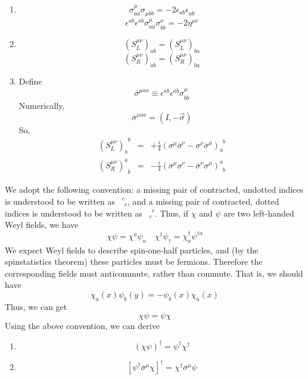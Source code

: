 \begin{newprop}
\begin{enumerate}
\item 
\[\sigma^{\mu}_{a\dot{a}} \sigma_{\mu b\dot{b}} = -2\epsilon_{ab} \epsilon_{\dot{a}\dot{b}}\]
\[\epsilon^{ab}\epsilon^{\dot{a}\dot{b}} \sigma^{\mu}_{a\dot{a}} \sigma^{\nu}_{b\dot{b}} = -2\eta^{\mu\nu}\]
\item \[(S_L^{\mu\nu})_{ab} = (S_L^{\mu\nu})_{ba}\]
\[(S_R^{\mu\nu})_{\dot{a}\dot{b}} = (S_R^{\mu\nu})_{\dot{b}\dot{a}}\]
\item Define
\[\overline{\sigma}^{\mu \dot{a} a} \equiv \epsilon^{ab} \epsilon^{\dot{a}\dot{b}} \sigma^{\mu}_{b\dot{b}}\]
Numerically,
\[\overline{\sigma}^{\mu \dot{a} a} = (I , -\vec{\sigma})\]
So,
\begin{eqnarray}
(S_L^{\mu\nu})_a^{\phantom{a}b} &=& + \frac{i}{4} (\sigma^{\mu} \overline{\sigma}^{\nu} - \sigma^{\nu} \overline{\sigma}^{\mu})_a^{\phantom{a}b} \nonumber \\
(S_R^{\mu\nu})^{\dot{a}}_{\phantom{\dot{a}} \dot{b}} &=& - \frac{i}{4}(\overline{\sigma}^{\mu}\sigma^{\nu} - \overline{\sigma}^{\nu} \sigma^{\mu})^{\dot{a}}_{\phantom{\dot{a}} \dot{b}} \nonumber
\end{eqnarray}
\end{enumerate}
\end{newprop}

\noindent
We adopt the following convention: a missing pair of contracted,
undotted indices is understood to be written as $\phantom{1}^c_{\phantom{c}c}$, and a missing pair of
contracted, dotted indices is understood to be written as $\phantom{1}_{\dot{c}}^{\phantom{c}\dot{c}}$. Thus, if $\chi$ and
$\psi$ are two left-handed Weyl fields, we have
\[\chi \psi = \chi^{a}\psi_{a} \quad \chi^{\dagger} \psi_{\dagger} = \chi^{\dagger}_{\dot{a}} \psi^{\dagger \dot{a}}\]
We expect Weyl fields to describe spin-one-half particles, and (by the spinstatistics theorem) these particles must be fermions. Therefore the corresponding fields must anticommute, rather than commute. That is, we should have
\[\chi_a(x) \psi_b(y) = - \psi_b(x) \chi_a(x)\]
Thus, we can get
\[\chi\psi = \psi\chi\]
Using the above convention, we can derive

\begin{newprop}
\begin{enumerate}
\item \[(\chi\psi)^{\dagger} = \psi^{\dagger}\chi^{\dagger}\]
\item \[[\psi^{\dagger} \overline{\sigma}^{\mu} \chi]^{\dagger} = \chi^{\dagger} \overline{\sigma}^{\mu} \psi\]
\end{enumerate}
\end{newprop}

